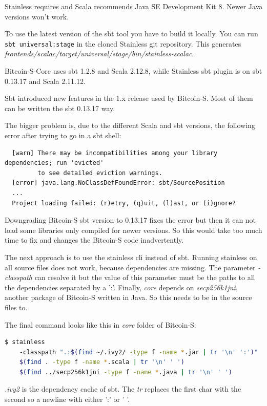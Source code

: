 \documentclass[runningheads]{llncs}
\begin{document}
Stainless requires and Scala recommends Java SE Development Kit 8.
Newer Java versions won't work.

To use the latest version of the sbt tool you have to build it
locally.  You can run \texttt{sbt universal:stage} in the cloned
Stainless git repository.  This generates
\emph{frontends/scalac/target/universal/stage/bin/stainless-scalac}.

Bitcoin-S-Core uses sbt 1.2.8 and Scala 2.12.8, while Stainless sbt
plugin is on sbt 0.13.17 and Scala 2.11.12.

Sbt introduced new features in the 1.x release used by Bitcoin-S.
Most of them can be written the sbt 0.13.17 way.

The bigger problem is, due to the different Scala and sbt versions,
the following error after trying to go in a sbt shell:
\begin{verbatim}
  [warn] There may be incompatibilities among your library dependencies; run 'evicted'
         to see detailed eviction warnings.
  [error] java.lang.NoClassDefFoundError: sbt/SourcePosition
  ...
  Project loading failed: (r)etry, (q)uit, (l)ast, or (i)gnore?
\end{verbatim}

Downgrading Bitcoin-S sbt version to 0.13.17 fixes the error but then
it can not load some libraries only compiled for newer versions.  So
this would take too much time to fix and changes the Bitcoin-S code
inadvertently.

The next approach is to use the stainless cli instead of sbt.  Running
stainless on all source files does not work, because dependencies are
missing.  The parameter \emph{-classpath} can resolve it but the value
of this parameter must be the paths to all the dependencies separated
by a ':'.  Finally, \emph{core} depends on \emph{secp256k1jni},
another package of Bitcoin-S written in Java.  So this needs to be in
the source files to.

The final command looks like this in \emph{core} folder of Bitcoin-S:
\begin{lstlisting}[language=bash]
  $ stainless
    -classpath ".:$(find ~/.ivy2/ -type f -name *.jar | tr '\n' ':')"
    $(find . -type f -name *.scala | tr '\n' ' ')
    $(find ../secp256k1jni -type f -name *.java | tr '\n' ' ')
\end{lstlisting}

\emph{.ivy2} is the dependency cache of sbt.  The \emph{tr} replaces
the first char with the second so a newline with either ':' or ' '.
\end{document}
